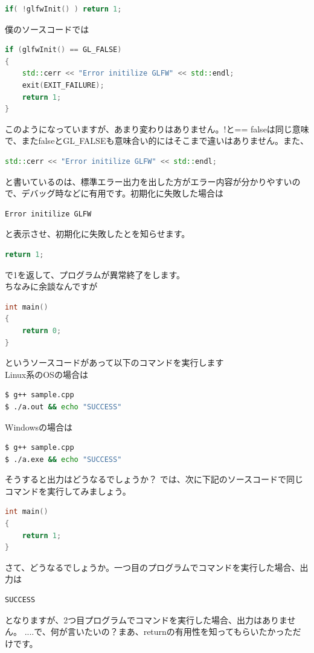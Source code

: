 \documentclass[a4paper,titlepage,dvipdfmx]{jsarticle}
\begin{document}
\begin{lstlisting}[language=C++]
if( !glfwInit() ) return 1;
\end{lstlisting}
僕のソースコードでは
\begin{lstlisting}[language=C++]
if (glfwInit() == GL_FALSE)
{
	std::cerr << "Error initilize GLFW" << std::endl;
	exit(EXIT_FAILURE);
	return 1;
}
\end{lstlisting}
このようになっていますが、あまり変わりはありません。!と== falseは同じ意味で、またfalseとGL\verb|_|FALSEも意味合い的にはそこまで違いはありません。また、
\begin{lstlisting}[language=C++]
std::cerr << "Error initilize GLFW" << std::endl;
\end{lstlisting}
と書いているのは、標準エラー出力を出した方がエラー内容が分かりやすいので、デバッグ時などに有用です。初期化に失敗した場合は
\begin{lstlisting}[language=bash]
Error initilize GLFW
\end{lstlisting}
と表示させ、初期化に失敗したとを知らせます。
\begin{lstlisting}[language=C++]
return 1;
\end{lstlisting}
で1を返して、プログラムが異常終了をします。\\
ちなみに余談なんですが
\newpage
\begin{lstlisting}[caption = sample.cpp,language = C++]
int main()
{
	return 0;
}
\end{lstlisting}
というソースコードがあって以下のコマンドを実行します\\Linux系のOSの場合は
\begin{lstlisting}[language=bash]
$ g++ sample.cpp
$ ./a.out && echo "SUCCESS"
\end{lstlisting}
Windowsの場合は
\begin{lstlisting}[language=bash]
$ g++ sample.cpp
$ ./a.exe && echo "SUCCESS"
\end{lstlisting}
そうすると出力はどうなるでしょうか？
では、次に下記のソースコードで同じコマンドを実行してみましょう。
\begin{lstlisting}[caption = sample.cpp,language = C++]
int main()
{
	return 1;
}
\end{lstlisting}
さて、どうなるでしょうか。一つ目のプログラムでコマンドを実行した場合、出力は
\begin{lstlisting}[language=bash]
SUCCESS
\end{lstlisting}
となりますが、2つ目プログラムでコマンドを実行した場合、出力はありません。
....で、何が言いたいの？まあ、returnの有用性を知ってもらいたかっただけです。
\end{document}

